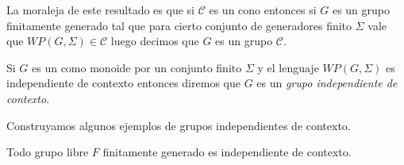 \documentclass[tesis.tex]{subfiles}
\begin{document}
La moraleja de este resultado es que si $\mathcal{C}$ es un cono entonces si $G$ es un grupo finitamente generado tal que para cierto conjunto de generadores finito $\Sigma$ vale que $WP(G, \Sigma) \in \mathcal{C}$ luego decimos que $G$ es un grupo $\mathcal{C}$.



\begin{deff}
	Si $G$ es un \fg como monoide por un conjunto finito $\Sigma$ y el lenguaje $WP(G, \Sigma)$ es independiente de contexto entonces diremos que $G$ es un \emph{grupo independiente de contexto}.
\end{deff}

Construyamos algunos ejemplos de grupos independientes de contexto.
\begin{prop}
	Todo grupo libre $F$ finitamente generado es independiente de contexto.
\end{prop}
\end{document}
